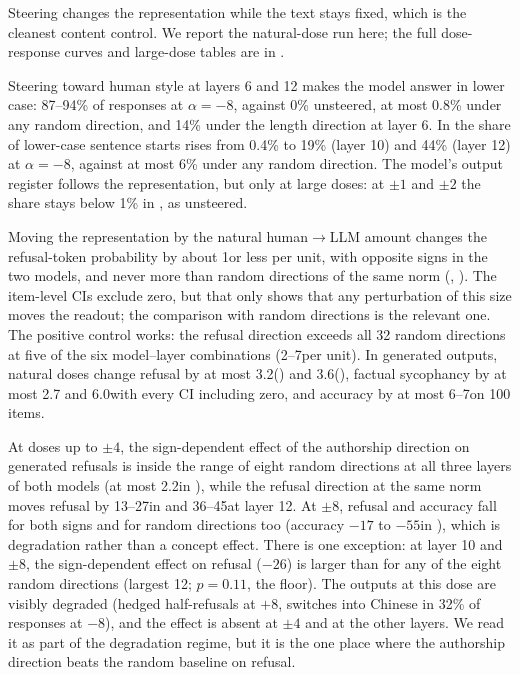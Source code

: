 Steering changes the representation while the text stays fixed, which is the cleanest content control.
We report the natural-dose run here; the full dose-response curves and large-dose tables are in .

Steering toward human style at \llama layers 6 and 12 makes the model answer in lower case: 87--94\% of responses at $\alpha=-8$, against 0\% unsteered, at most 0.8\% under any random direction, and 14\% under the length direction at layer 6.
In \qwen the share of lower-case sentence starts rises from 0.4\% to 19\% (layer 10) and 44\% (layer 12) at $\alpha=-8$, against at most 6\% under any random direction.
The model's output register follows the representation, but only at large doses: at $\pm1$ and $\pm2$ the share stays below 1\% in \llama, as unsteered.

Moving the representation by the natural human$\rightarrow$LLM amount changes the refusal-token probability by about 1\pp or less per unit, with opposite signs in the two models, and never more than random directions of the same norm (, ).
The item-level CIs exclude zero, but that only shows that any perturbation of this size moves the readout; the comparison with random directions is the relevant one.
The positive control works: the refusal direction exceeds all 32 random directions at five of the six model--layer combinations (2--7\pp per unit).
In generated outputs, natural doses change refusal by at most 3.2\pp (\llama) and 3.6\pp (\qwen), factual sycophancy by at most 2.7 and 6.0\pp with every CI including zero, and accuracy by at most 6--7\pp on 100 items.

At doses up to $\pm4$, the sign-dependent effect of the authorship direction on generated refusals is inside the range of eight random directions at all three layers of both models (at most 2.2\pp in \qwen), while the refusal direction at the same norm moves refusal by 13--27\pp in \qwen and 36--45\pp at \llama layer 12.
At $\pm8$, refusal and accuracy fall for both signs and for random directions too (accuracy $-17$ to $-55$\pp in \qwen), which is degradation rather than a concept effect.
There is one exception: at \qwen layer 10 and $\pm8$, the sign-dependent effect on refusal ($-26$\pp) is larger than for any of the eight random directions (largest 12\pp; $p=0.11$, the floor).
The outputs at this dose are visibly degraded (hedged half-refusals at $+8$, switches into Chinese in 32\% of responses at $-8$), and the effect is absent at $\pm4$ and at the other layers.
We read it as part of the degradation regime, but it is the one place where the authorship direction beats the random baseline on refusal.

